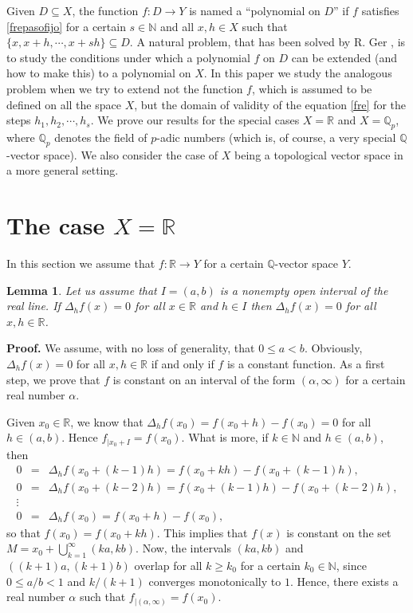 \documentclass[12pt,a4paper]{amsart}
\newtheorem{lemma}[theorem]{Lemma}
\theoremstyle{definition}
\begin{document}
Given $D\subseteq X$, the function $f:D\to Y$ is named a ``polynomial on $D$'' if $f$ satisfies \eqref{frepasofijo} for a certain $s\in\mathbb{N}$ and all $x,h\in X$ such that $\{x,x+h,\cdots,x+sh\}\subseteq D$. A natural problem, that has been solved by R. Ger \cite{ger}, is to study the conditions under which a polynomial $f$ on $D$ can be extended (and how to make this) to a polynomial on $X$. In this paper we study the analogous problem when we try to extend not the function $f$, which is assumed to be defined on all the space $X$, but the domain of validity of the equation \eqref{fre} for the steps $h_1,h_2,\cdots, h_s$. We prove our results for the special cases $X=\mathbb{R}$ and $X=\mathbb{Q}_p$, where $\mathbb{Q}_p$ denotes the field of $p$-adic numbers (which is, of course, a very special $\mathbb{Q}$-vector space). We also consider the case of $X$ being a topological vector space in a more general setting.

\section{The case $X=\mathbb{R}$}
In this section we assume that $f:\mathbb{R}\to Y$ for a certain $\mathbb{Q}$-vector space $Y$.

\begin{lemma}\label{lema} Let us assume that $I=(a,b)$ is a nonempty open interval of the real line. If $\Delta_hf(x)=0$ for all $x\in\mathbb{R}$ and $h\in I$ then $\Delta_hf(x)=0$ for all $x,h\in\mathbb{R}$.
\end{lemma}

\noindent \textbf{Proof.} We assume, with no loss of generality, that $0\leq a<b$. Obviously, $\Delta_hf(x)=0$ for all $x,h\in\mathbb{R}$ if and only if $f$ is a constant function. As a first step, we prove that $f$ is constant on an interval of the form $(\alpha,\infty)$ for a certain real number $\alpha$.

Given $x_0\in\mathbb{R}$, we know that $\Delta_hf(x_0)=f(x_0+h)-f(x_0)=0$ for all $h\in (a,b)$. Hence $f_{|x_0+I}=f(x_0)$. What is more, if $k\in\mathbb{N}$ and $h\in (a,b)$, then
\begin{eqnarray*}
0 &=& \Delta_hf(x_0+(k-1)h) = f(x_0+kh)-f(x_0+(k-1)h),\\
0 &=& \Delta_hf(x_0+(k-2)h) = f(x_0+(k-1)h)-f(x_0+(k-2)h),\\
\vdots & & \\
0 &=& \Delta_hf(x_0) = f(x_0+h)-f(x_0),
\end{eqnarray*}
so that $f(x_0)=f(x_0+kh)$. This implies that $f(x)$ is constant on the set $M=x_0+\bigcup_{k=1}^\infty(ka,kb)$. Now, the intervals $(ka,kb)$ and $((k+1)a,(k+1)b)$ overlap for all $k\geq k_0$ for a certain $k_0\in\mathbb{N}$, since $0\leq a/b<1$ and $k/(k+1)$ converges monotonically to $1$. Hence, there exists a real number $\alpha$ such that $f_{|(\alpha,\infty)}=f(x_0)$.
\end{document}
